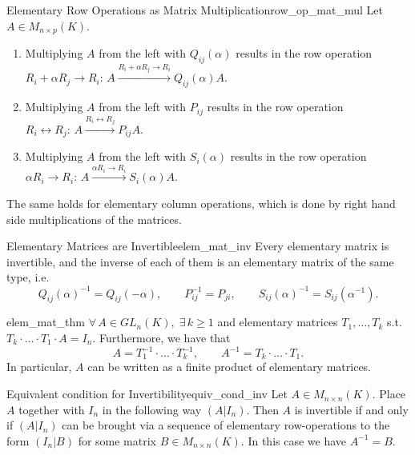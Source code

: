 \begin{lemma}{Elementary Row Operations as Matrix Multiplication}{row_op_mat_mul}
	Let $A \in M_{n \times p}(K)$. 
	\begin{enumerate}
		\item Multiplying $A$ from the left with $Q_{ij}(\alpha)$ results in the row operation $R_i + \alpha R_j \longrightarrow R_i: \, A \overset{R_i + \alpha R_j \to R_i}{\rightarrow} Q_{ij}(\alpha) A$.
		\item Multiplying $A$ from the left with $P_{ij}$ results in the row operation $R_i \longleftrightarrow R_j: \, A \overset{R_i \leftrightarrow R_j}{\longrightarrow} P_{ij} A$.
		\item Multiplying $A$ from the left with $S_i(\alpha)$ results in the row operation $\alpha R_i \longrightarrow R_i: \, A \overset{\alpha R_i \to R_i}{\longrightarrow} S_i(\alpha) A$.
	\end{enumerate}
	The same holds for elementary column operations, which is done by right hand side multiplications of the matrices.
\end{lemma}

\begin{lemma}{Elementary Matrices are Invertible}{elem_mat_inv}
	Every elementary matrix is invertible, and the inverse of each of them is an elementary matrix of the same type, i.e.
	\[
		Q_{ij}(\alpha)^{-1} = Q_{ij}(-\alpha), \qquad P_{ij}^{-1} = P_{ji}, \qquad S_{ij}(\alpha )^{-1} = S_{ij}(\alpha ^{-1}).
	\]
\end{lemma}

\begin{theorem}{}{elem_mat_thm}
	$\forall \, A \in GL_n(K), \; \exists\, k \geq 1$ and elementary matrices $T_1, \hdots , T_k$ s.t. $T_k\cdot \hdots \cdot T_1 \cdot A = I_n$. Furthermore, we have that
	\[
		A = T_1^{-1}\cdot \hdots \cdot T_k^{-1}, \qquad A^{-1} = T_k\cdot \hdots \cdot T_1.
	\]
	In particular, $A$ can be written as a finite product of elementary matrices.
\end{theorem}

\begin{theorem}{Equivalent condition for Invertibility}{equiv_cond_inv}
	Let $A \in M_{n \times n}(K)$. Place $A$ together with $I_n$ in the following way $(A | I_n)$. Then $A$ is invertible if and only if $(A | I_n)$ can be brought via a sequence of elementary row-operations to the form $(I_n | B)$ for some matrix $B \in M_{n \times n}(K)$. In this case we have $A^{-1} = B$.
\end{theorem}





